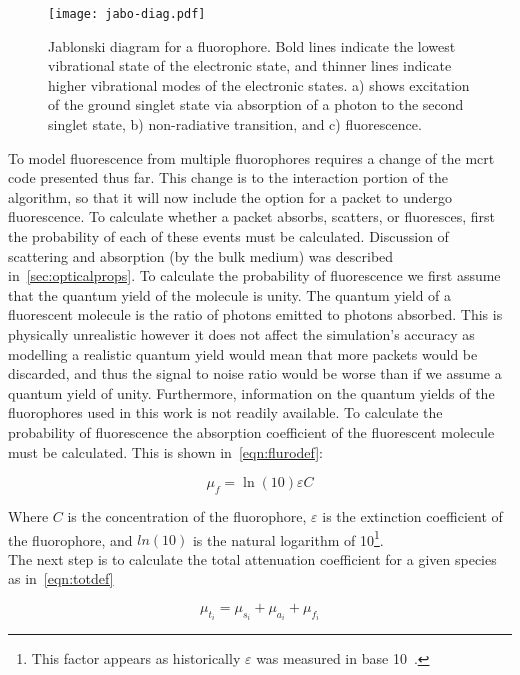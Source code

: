 \begin{figure}[!htpb]
	\centering
	\texttt{[image: jabo-diag.pdf]}
	\caption{Jablonski diagram for a fluorophore. Bold lines indicate the lowest vibrational state of the electronic state, and thinner lines indicate higher vibrational modes of the electronic states. a) shows excitation of the ground singlet state via absorption of a photon to the second singlet state, b) non-radiative transition, and c) fluorescence.}
	\label{fig:Jabo}
\end{figure}

To model fluorescence from multiple fluorophores requires a change of the \gls*{mcrt} code presented thus far.
This change is to the interaction portion of the algorithm, so that it will now include the option for a packet to undergo fluorescence.
To calculate whether a packet absorbs, scatters, or fluoresces, first the probability of each of these events must be calculated.
Discussion of scattering and absorption (by the bulk medium) was described in~\cref{sec:opticalprops}.
To calculate the probability of fluorescence we first assume that the quantum yield of the molecule is unity.
The quantum yield of a fluorescent molecule is the ratio of photons emitted to photons absorbed.
This is physically unrealistic however it does not affect the simulation's accuracy as modelling a realistic quantum yield would mean that more packets would be discarded, and thus the signal to noise ratio would be worse than if we assume a quantum yield of unity.
Furthermore, information on the quantum yields of the fluorophores used in this work is not readily available.
To calculate the probability of fluorescence the absorption coefficient of the fluorescent molecule must be calculated.
This is shown in~\cref{eqn:flurodef}:

\begin{equation}
\mu_f=\ln\left(10\right)\varepsilon C
\label{eqn:flurodef}
\end{equation}

Where $C$ is the concentration of the fluorophore, $\varepsilon$ is the extinction coefficient of the fluorophore, and $ln(10)$ is the natural logarithm of 10\footnote{This factor appears as historically $\varepsilon$ was measured in base 10~\cite{jacques2013optical}.}.\\

The next step is to calculate the total attenuation coefficient for a given species as in~\cref{eqn:totdef}

\begin{equation}
\mu_{t_i}=\mu_{s_i}+\mu_{a_i}+\mu_{f_i}
\label{eqn:totdef}
\end{equation}

